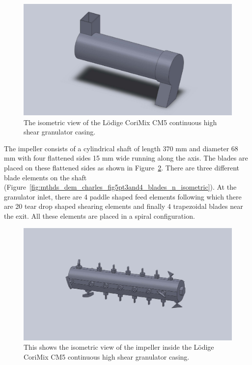 \documentclass[preprint,11pt,authoryear]{elsarticle}
\begin{document}
\begin{figure}
\centering
\includegraphics[scale=0.15]{shell_final_pic.pdf}
\caption{The isometric view of the L\"{o}dige CoriMix CM5 continuous high shear granulator casing.}
\label{fig:mthdsDemCharlesGranShell}
\end{figure}

The impeller consists of a cylindrical shaft of length 370 mm and diameter 68 mm with four 
flattened sides 15 mm wide running along the axis. The blades are placed on these flattened sides as 
shown in Figure~\ref{fig:mthds_dem_charles_impeller}. There are three different blade elements on the 
shaft (Figure~\ref{fig:mthds_dem_charles_fig5pt3and4_blades_n_isometric}). At the granulator inlet, 
there are 4 paddle shaped feed elements following which there are 20 tear drop shaped shearing 
elements  and finally 4 trapezoidal blades near the exit. All these elements are placed in 
a spiral configuration. 

\begin{figure}
\centering
\includegraphics[scale=0.15]{impeller_final_pic.pdf}
\caption{This shows the isometric view of the impeller inside the L\"{o}dige CoriMix CM5 continuous 
high shear granulator casing.}
\label{fig:mthds_dem_charles_impeller}
\end{figure}    
\end{document}
